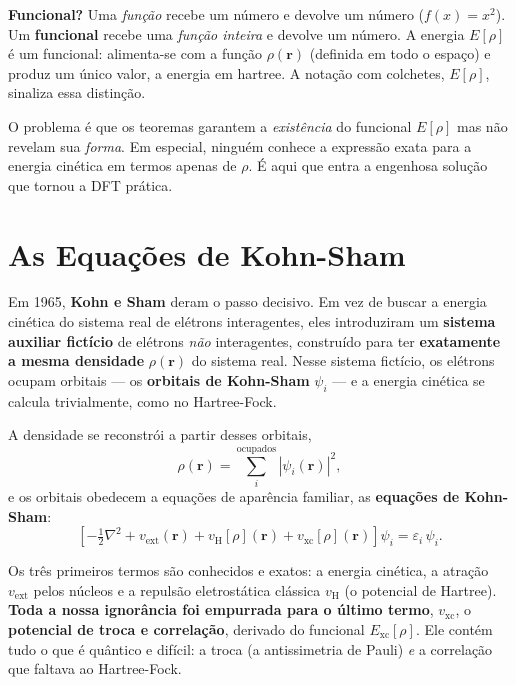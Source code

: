 \begin{caixanota}
\textbf{Funcional?} Uma \emph{função} recebe um número e devolve um número
($f(x) = x^2$). Um \textbf{funcional} recebe uma \emph{função inteira} e devolve um
número. A energia $E[\rho]$ é um funcional: alimenta-se com a função
$\rho(\mathbf{r})$ (definida em todo o espaço) e produz um único valor, a energia
em hartree. A notação com colchetes, $E[\rho]$, sinaliza essa distinção.
\end{caixanota}

O problema é que os teoremas garantem a \emph{existência} do funcional $E[\rho]$
mas não revelam sua \emph{forma}. Em especial, ninguém conhece a expressão exata
para a energia cinética em termos apenas de $\rho$. É aqui que entra a engenhosa
solução que tornou a DFT prática.

\section{As Equações de Kohn-Sham}
\label{sec:kohnsham}

Em 1965, \textbf{Kohn e Sham} deram o passo decisivo. Em vez de buscar a energia
cinética do sistema real de elétrons interagentes, eles introduziram um
\textbf{sistema auxiliar fictício} de elétrons \emph{não} interagentes, construído
para ter \textbf{exatamente a mesma densidade} $\rho(\mathbf{r})$ do sistema real.
Nesse sistema fictício, os elétrons ocupam orbitais --- os \textbf{orbitais de
Kohn-Sham} $\psi_i$ --- e a energia cinética se calcula trivialmente, como no
Hartree-Fock.

A densidade se reconstrói a partir desses orbitais,
\begin{equation}
  \rho(\mathbf{r}) = \sum_i^{\text{ocupados}} |\psi_i(\mathbf{r})|^2,
  \label{eq:rhoKS}
\end{equation}
e os orbitais obedecem a equações de aparência familiar, as \textbf{equações de
Kohn-Sham}:
\begin{equation}
  \left[ -\tfrac{1}{2}\nabla^2 + v_{\text{ext}}(\mathbf{r})
         + v_{\text{H}}[\rho](\mathbf{r})
         + v_{\text{xc}}[\rho](\mathbf{r}) \right] \psi_i
  = \varepsilon_i\,\psi_i.
  \label{eq:ks}
\end{equation}

\noindent
Os três primeiros termos são conhecidos e exatos: a energia cinética, a atração
$v_{\text{ext}}$ pelos núcleos e a repulsão eletrostática clássica $v_{\text{H}}$
(o potencial de Hartree). \textbf{Toda a nossa ignorância foi empurrada para o
último termo}, $v_{\text{xc}}$, o \textbf{potencial de troca e correlação}, derivado
do funcional $E_{\text{xc}}[\rho]$. Ele contém tudo o que é quântico e difícil: a
troca (a antissimetria de Pauli) \emph{e} a correlação que faltava ao
Hartree-Fock.

